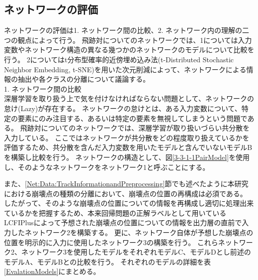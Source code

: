 \subsection{ネットワークの評価} \label{Net:PM:PerformanceofPM}

ネットワークの評価は1. ネットワーク間の比較、2. ネットワーク内の理解の二つの観点によって行う。
飛跡対についてのネットワークでは、1については入力変数やネットワーク構造の異なる幾つかのネットワークのモデルについて比較を行う。
2についてはt分布型確率的近傍埋め込み法(t-Distributed Stochastic Neighbor Embedding, t-SNE\cite{t-SNEpaper})を用いた次元削減によって、ネットワークによる情報の抽出や各クラスの分離について議論する。\\

1. ネットワーク間の比較\\

深層学習を取り扱う上で気を付けなければならない問題として、ネットワークの怠け(Lazy)が存在する。
ネットワークの怠けとは、ある入力変数について、特定の要素にのみ注目する、あるいは特定の要素を無視してしまうという問題である。
飛跡対についてのネットワークでは、深層学習が取り扱いづらい共分散を入力している。
ここではネットワークが共分散をどの程度取り扱えているかを評価するため、共分散を含んだ入力変数を用いたモデルと含んでいないモデルBを構築し比較を行う。
ネットワークの構造として、図\ref{3-3-1-1PairModel}を使用し、そのようなネットワークをネットワーク1と呼ぶことにする。

また、\ref{Net:Data:TrackInformationandPreprocessing}節でも述べたように本研究における崩壊点の種類の分離において、崩壊点の位置の再構成は必須である。
したがって、そのような崩壊点の位置についての情報を再構成し適切に処理出来ているかを把握するため、本来回帰問題の正解ラベルとして用いているLCFIPlusによって予想された崩壊点の位置についての情報を出力層の直前で入力したネットワーク2を構築する。
更に、ネットワーク自体が予想した崩壊点の位置を明示的に入力に使用したネットワーク3の構築を行う。
これらネットワーク2、ネットワーク3を使用したモデルをそれぞれモデルC、モデルDとし前述のモデルA、モデルBとの比較を行う。
それぞれのモデルの詳細を表\ref{EvalationModels}にまとめる。

